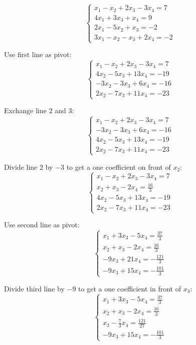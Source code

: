 \documentclass[A4paper]{article}
\begin{document}
\[
\begin{cases}
  x_1 - x_2 + 2x_3 -3x_4 = 7\\
  4x_1 + 3x_3 + x_4 = 9\\
  2x_1 - 5x_2 + x_3 = -2\\
  3x_1 - x_2 -x_3 + 2x_4 = -2
\end{cases}
\]

Use first line as pivot:
\[
\begin{cases}
  x_1 - x_2 + 2x_3 -3x_4 = 7\\
  4x_2 - 5x_3 + 13x_4 = -19\\
   -3x_2 -3x_3 +6x_4 = -16\\
   2x_2 -7x_3 + 11x_4 = -23
\end{cases}
\]

Exchange line $2$ and $3$:
\[
\begin{cases}
  x_1 - x_2 + 2x_3 -3x_4 = 7\\
  -3x_2 -3x_3 +6x_4 = -16\\
  4x_2 - 5x_3 + 13x_4 = -19\\   
  2x_2 -7x_3 + 11x_4 = -23
\end{cases}
\]

Divide line $2$ by $-3$ to get a one coefficient on front of $x_2$:
\[
\begin{cases}
  x_1 - x_2 + 2x_3 -3x_4 = 7\\
  x_2 +x_3 -2x_4 = \frac{16}{3}\\
  4x_2 - 5x_3 + 13x_4 = -19\\   
  2x_2 -7x_3 + 11x_4 = -23
\end{cases}
\]

Use second line as pivot:
\[
\begin{cases}
  x_1  + 3x_3 -5x_4 = \frac{37}{3}\\
  x_2 +x_3 -2x_4 = \frac{16}{3}\\
   -9x_3 + 21x_4 = -\frac{121}{3}\\   
   -9x_3 + 15x_4 = -\frac{101}{3}
\end{cases}
\]

Divide third line by $-9$ to get a one coefficient in front of $x_3$:
\[
\begin{cases}
  x_1  + 3x_3 -5x_4 = \frac{37}{3}\\
  x_2 +x_3 -2x_4 = \frac{16}{3}\\
   x_3 - \frac{7}{3}x_4 = \frac{121}{27}\\   
   -9x_3 + 15x_4 = -\frac{101}{3}
\end{cases}
\]
\end{document}
